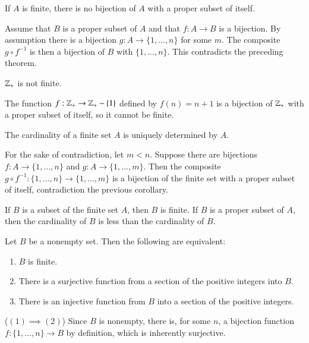 \documentclass[12pt, a4paper, twoside, openright, titlepage]{book}
\begin{document}
\begin{appendices}
    \begin{cor}{}{}
        If $A$ is finite, there is no bijection of $A$ with a proper subset of itself.
    \end{cor}
    \begin{proof*}{}{}
        Assume that $B$ is a proper subset of $A$ and that $f:A\rightarrow B$ is a bijection. By assumption there is a bijection $g:A\rightarrow \{1,...,n\}$ for some $m$. The composite $g \circ f^{-1}$ is then a bijection of $B$ with $\{1,...,n\}$. This contradicts the preceding theorem.
    \end{proof*}


    \begin{cor}{}{}
        $\mathbb Z_+$ is not finite.
    \end{cor}
    \begin{proof*}{}{}
        The function $f:\mathbb Z_+\rightarrow \mathbb Z_+ -\{1\}$ defined by $f(n) = n+1$ is a bijection of $\mathbb Z_+$ with a proper subset of itself, so it cannot be finite.
    \end{proof*}


    \begin{cor}{}{}
        The cardinality of a finite set $A$ is uniquely determined by $A$.
    \end{cor}
    \begin{proof*}{}{}
        For the sake of contradiction, let $m < n$. Suppose there are bijections $f:A\rightarrow \{1,...,n\}$ and $g:A\rightarrow \{1,...,m\}$. Then the composite $g\circ f^{-1}:\{1,...,n\}\rightarrow \{1,...,m\}$ is a bijection of the finite set with a proper subset of itself, contradiction the previous corollary.
    \end{proof*}


    \begin{cor}{}{}
        If $B$ is a subset of the finite set $A$, then $B$ is finite. If $B$ is a proper subset of $A$, then the cardinality of $B$ is less than the cardinality of $B$.
    \end{cor}
    

    \begin{cor}{}{}
        Let $B$ be a nonempty set. Then the following are equivalent:\begin{enumerate}
            \item $B$ is finite.
            \item There is a surjective function from a section of the positive integers into $B$.
            \item There is an injective function from $B$ into a section of the positive integers.
        \end{enumerate}
    \end{cor}
    \begin{proof*}{}{}
        ($(1)\implies (2)$) Since $B$ is nonempty, there is, for some $n$, a bijection function $f:\{1,...,n\}\rightarrow B$ by definition, which is inherently surjective.


\end{proof*}
\end{appendices}
\end{document}
